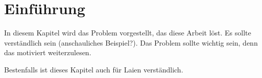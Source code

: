 \chapter{Einführung}\label{sec:intro}

In diesem Kapitel wird das Problem vorgestellt, das diese Arbeit löst.
Es sollte verständlich sein (anschauliches Beispiel?).
Das Problem sollte wichtig sein,
denn das motiviert weiterzulesen.

Bestenfalls ist dieses Kapitel auch für Laien verständlich.

